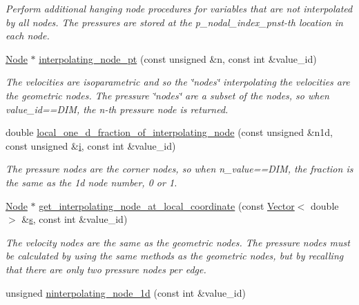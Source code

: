 \begin{DoxyCompactItemize}
\begin{DoxyCompactList}\small\item\em Perform additional hanging node procedures for variables that are not interpolated by all nodes. The pressures are stored at the p\+\_\+nodal\+\_\+index\+\_\+pnst-\/th location in each node. \end{DoxyCompactList}\item 
\hyperlink{classoomph_1_1Node}{Node} $\ast$ \hyperlink{classoomph_1_1RefineablePolarTaylorHoodElement_a6308630841a165e4152d0765ed468871}{interpolating\+\_\+node\+\_\+pt} (const unsigned \&n, const int \&value\+\_\+id)
\begin{DoxyCompactList}\small\item\em The velocities are isoparametric and so the \char`\"{}nodes\char`\"{} interpolating the velocities are the geometric nodes. The pressure \char`\"{}nodes\char`\"{} are a subset of the nodes, so when value\+\_\+id==D\+IM, the n-\/th pressure node is returned. \end{DoxyCompactList}\item 
double \hyperlink{classoomph_1_1RefineablePolarTaylorHoodElement_ae3c1d8f74764f9b81724c12d3f0c8569}{local\+\_\+one\+\_\+d\+\_\+fraction\+\_\+of\+\_\+interpolating\+\_\+node} (const unsigned \&n1d, const unsigned \&\hyperlink{cfortran_8h_adb50e893b86b3e55e751a42eab3cba82}{i}, const int \&value\+\_\+id)
\begin{DoxyCompactList}\small\item\em The pressure nodes are the corner nodes, so when n\+\_\+value==D\+IM, the fraction is the same as the 1d node number, 0 or 1. \end{DoxyCompactList}\item 
\hyperlink{classoomph_1_1Node}{Node} $\ast$ \hyperlink{classoomph_1_1RefineablePolarTaylorHoodElement_a2fe498d948d77e7bc89e68c787b4e539}{get\+\_\+interpolating\+\_\+node\+\_\+at\+\_\+local\+\_\+coordinate} (const \hyperlink{classoomph_1_1Vector}{Vector}$<$ double $>$ \&\hyperlink{cfortran_8h_ab7123126e4885ef647dd9c6e3807a21c}{s}, const int \&value\+\_\+id)
\begin{DoxyCompactList}\small\item\em The velocity nodes are the same as the geometric nodes. The pressure nodes must be calculated by using the same methods as the geometric nodes, but by recalling that there are only two pressure nodes per edge. \end{DoxyCompactList}\item 
unsigned \hyperlink{classoomph_1_1RefineablePolarTaylorHoodElement_a24cc791779fb7eb9c46875b242715345}{ninterpolating\+\_\+node\+\_\+1d} (const int \&value\+\_\+id)

\end{DoxyCompactItemize}
